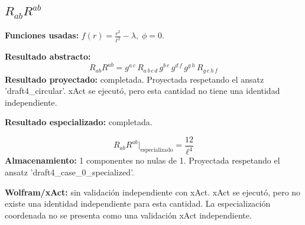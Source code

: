 \documentclass[11pt]{article}
\begin{document}
\subsection*{$ R_{ab}R^{ab} $}
\textbf{Funciones usadas:} $ f\!\left(r\right) = \frac{{r}^{2}}{{\ell}^{2}} - \lambda,\;\phi=0 $.\par
\textbf{Resultado abstracto:}
\begin{dmath*}[breakdepth={5}]
R_{ab}R^{ab} = g{}^{a\,c}\,R{}_{a\,b\,c\,d}\,g{}^{b\,e}\,g{}^{d\,f}\,g{}^{g\,h}\,R{}_{g\,e\,h\,f}
\end{dmath*}
\textbf{Resultado proyectado:} completada. Proyectada respetando el ansatz 'draft4\_circular'. xAct se ejecutó, pero esta cantidad no tiene una identidad independiente.\par
\textbf{Resultado especializado:} completada.\par
\begin{dmath*}[breakdepth={5}]
R_{ab}R^{ab}\big|_{\mathrm{especializado}} = \frac{12}{{\ell}^{4}}
\end{dmath*}
\textbf{Almacenamiento:} 1 componentes no nulas de 1. Proyectada respetando el ansatz 'draft4\_case\_0\_specialized'.\par
\textbf{Wolfram/xAct:} sin validación independiente con xAct. xAct se ejecutó, pero no existe una identidad independiente para esta cantidad. La especialización coordenada no se presenta como una validación xAct independiente.\par\medskip
{}
\end{document}
